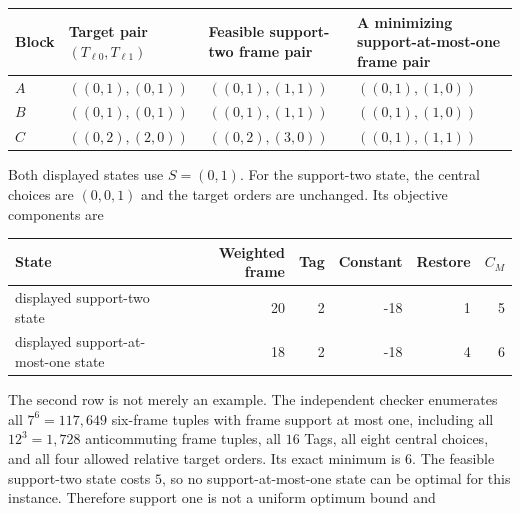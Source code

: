 \documentclass[11pt]{article}
\begin{document}
{\def\LTcaptype{none} %
\begin{longtable}[]{@{}
  >{\raggedright\arraybackslash}p{}
  >{\raggedright\arraybackslash}p{}
  >{\raggedright\arraybackslash}p{}
  >{\raggedright\arraybackslash}p{}@{}}
\toprule\noalign{}
\begin{minipage}[b]{\linewidth}\raggedright
Block
\end{minipage} & \begin{minipage}[b]{\linewidth}\raggedright
Target pair \((T_{\ell0},T_{\ell1})\)
\end{minipage} & \begin{minipage}[b]{\linewidth}\raggedright
Feasible support-two frame pair
\end{minipage} & \begin{minipage}[b]{\linewidth}\raggedright
A minimizing support-at-most-one frame pair
\end{minipage} \\
\midrule\noalign{}
\endhead
\bottomrule\noalign{}
\endlastfoot
\(A\) & \(((0,1),(0,1))\) & \(((0,1),(1,1))\) & \(((0,1),(1,0))\) \\
\(B\) & \(((0,1),(0,1))\) & \(((0,1),(1,1))\) & \(((0,1),(1,0))\) \\
\(C\) & \(((0,2),(2,0))\) & \(((0,2),(3,0))\) & \(((0,1),(1,1))\) \\
\end{longtable}
}

Both displayed states use \(S=(0,1)\). For the support-two state, the central choices are \((0,0,1)\) and the target orders are unchanged. Its objective components are

{\def\LTcaptype{none} %
\begin{longtable}[]{@{}lrrrrr@{}}
\toprule\noalign{}
State & Weighted frame & Tag & Constant & Restore & \(C_M\) \\
\midrule\noalign{}
\endhead
\bottomrule\noalign{}
\endlastfoot
displayed support-two state & 20 & 2 & -18 & 1 & 5 \\
displayed support-at-most-one state & 18 & 2 & -18 & 4 & 6 \\
\end{longtable}
}

The second row is not merely an example. The independent checker enumerates all \(7^6=117{,}649\) six-frame tuples with frame support at most one, including all \(12^3=1{,}728\) anticommuting frame tuples, all \(16\) Tags, all eight central choices, and all four allowed relative target orders. Its exact minimum is \(6\). The feasible support-two state costs \(5\), so no support-at-most-one state can be optimal for this instance. Therefore support one is not a uniform optimum bound and
\end{document}
